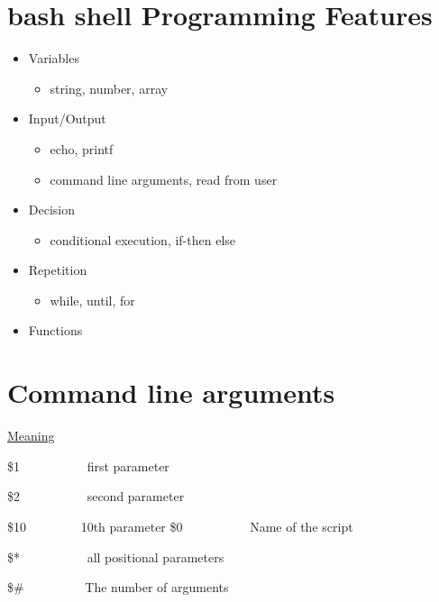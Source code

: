 \documentclass{report}
\begin{document}
\section{bash shell Programming Features}
\begin{itemize}
  \item Variables
    \begin{itemize}[label=$\circ$]
      \item string, number, array
    \end{itemize}
  \item Input/Output
    \begin{itemize}[label=$\circ$]
      \item echo, printf
      \item command line arguments, read from user
    \end{itemize}
  \item Decision 
    \begin{itemize}[label=$\circ$]
      \item conditional execution, if-then else
    \end{itemize}
  \item Repetition
    \begin{itemize}[label=$\circ$]
      \item while, until, for
    \end{itemize}
  \item Functions
\end{itemize}
\section{Command line arguments}
\hspace{15mm} \underline{Meaning} \vspace{1.5mm}

\noindent \$1 \ \ \ \ \ \ \ \ \ \ first parameter \vspace{1.5mm}

\noindent \$2 \ \ \ \ \ \ \ \ \ \ second parameter \vspace{1.5mm}

\noindent \${10} \ \ \ \ \ \ \ \ 10th parameter
\bigbreak \noindent
\$0 \ \ \ \ \ \ \ \ \ \ Name of the script \vspace{1.5mm}

\noindent \$* \ \ \ \ \ \ \ \ \ \ all positional parameters \vspace{1.5mm}

\noindent \$\# \ \ \ \ \ \ \ \ \ The number of arguments
\newpage
\end{document}
